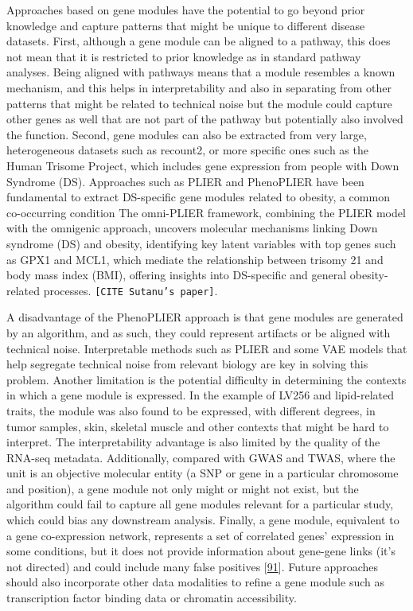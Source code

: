 Approaches based on gene modules have the potential to go beyond prior knowledge and capture patterns that might be unique to different disease datasets.
First, although a gene module can be aligned to a pathway, this does not mean that it is restricted to prior knowledge as in standard pathway analyses.
Being aligned with pathways means that a module resembles a known mechanism, and this helps in interpretability and also in separating from other patterns that might be related to technical noise but the module could capture other genes as well that are not part of the pathway but potentially also involved the function.
Second, gene modules can also be extracted from very large, heterogeneous datasets such as recount2, or more specific ones such as the Human Trisome Project, which includes gene expression from people with Down Syndrome (DS).
Approaches such as PLIER and PhenoPLIER have been fundamental to extract DS-specific gene modules related to obesity, a common co-occurring condition The omni-PLIER framework, combining the PLIER model with the omnigenic approach, uncovers molecular mechanisms linking Down syndrome (DS) and obesity, identifying key latent variables with top genes such as GPX1 and MCL1, which mediate the relationship between trisomy 21 and body mass index (BMI), offering insights into DS-specific and general obesity-related processes. \texttt{{[}CITE\ Sutanu’s\ paper{]}}.

A disadvantage of the PhenoPLIER approach is that gene modules are generated by an algorithm, and as such, they could represent artifacts or be aligned with technical noise.
Interpretable methods such as PLIER and some VAE models that help segregate technical noise from relevant biology are key in solving this problem.
Another limitation is the potential difficulty in determining the contexts in which a gene module is expressed.
In the example of LV256 and lipid-related traits, the module was also found to be expressed, with different degrees, in tumor samples, skin, skeletal muscle and other contexts that might be hard to interpret.
The interpretability advantage is also limited by the quality of the RNA-seq metadata.
Additionally, compared with GWAS and TWAS, where the unit is an objective molecular entity (a SNP or gene in a particular chromosome and position), a gene module not only might or might not exist, but the algorithm could fail to capture all gene modules relevant for a particular study, which could bias any downstream analysis.
Finally, a gene module, equivalent to a gene co-expression network, represents a set of correlated genes' expression in some conditions, but it does not provide information about gene-gene links (it's not directed) and could include many false positives {[}\protect\hyperlink{ref-jVQ2rMqc}{91}{]}.
Future approaches should also incorporate other data modalities to refine a gene module such as transcription factor binding data or chromatin accessibility.

